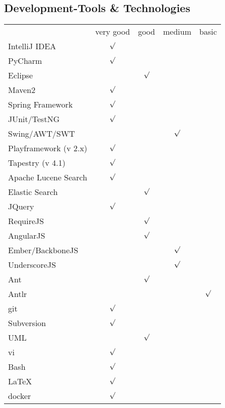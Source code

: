 \documentclass[11pt,a4paper,german]{moderncv}
\begin{document}
\subsection{Development-Tools \& Technologies}
{
\begin{tabular}{l*{4}{c}}
          & very good & good & medium & basic \\
IntelliJ IDEA & $ \surd $ & & & \\
PyCharm & $ \surd $ & & & \\
Eclipse &  & $\surd$& &  \\
Maven2 &  $\surd$ & & & \\
Spring Framework &  $\surd$ & & & \\
JUnit/TestNG & $\surd$ & & &  \\
Swing/AWT/SWT & & & $\surd$ &  \\
Playframework (v 2.x)& $ \surd $ & & & \\
Tapestry (v 4.1) & $ \surd $ & & & \\
Apache Lucene Search & $ \surd $ & & & \\
Elastic Search & & $ \surd $ & & \\
JQuery & $ \surd $ & & & \\
RequireJS & & $ \surd $ & & \\
AngularJS & & $ \surd $ & & \\
Ember/BackboneJS & & & $ \surd $ & \\
UnderscoreJS & & & $ \surd $ & \\
Ant & & $\surd$& &  \\
Antlr & & & & $\surd$ \\
git & $\surd$ & & &  \\
Subversion & $\surd$ & & &  \\
UML & & $\surd$& &  \\
vi & $\surd$ &  & & \\
Bash & $\surd$ & & &  \\
\LaTeX & $\surd$ & & & \\
docker & $\surd$ & & & \\
\end{tabular}
}{}




\end{document}
